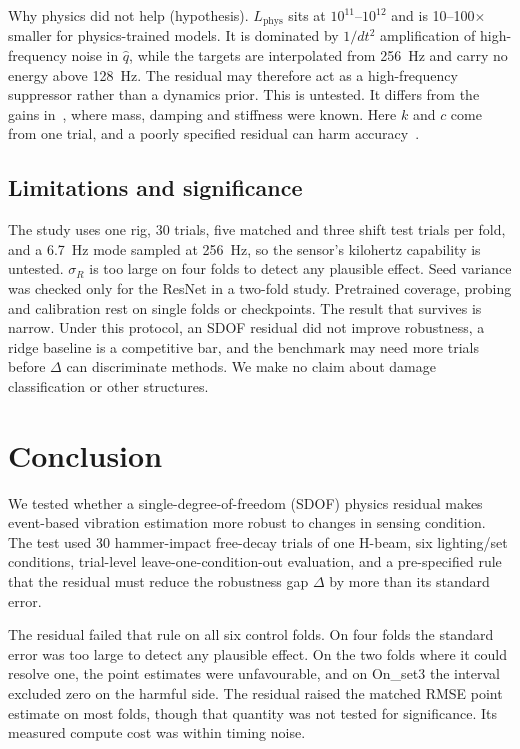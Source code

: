 \documentclass[conference]{IEEEtran}
\begin{document}
Why physics did not help (hypothesis). $L_{\mathrm{phys}}$ sits at $10^{11}$--$10^{12}$ and is 10--100$\times$ smaller for physics-trained models. It is dominated by $1/dt^2$ amplification of high-frequency noise in $\hat{q}$, while the targets are interpolated from 256~Hz and carry no energy above 128~Hz. The residual may therefore act as a high-frequency suppressor rather than a dynamics prior. This is untested. It differs from the gains in~\cite{Wang2024}, where mass, damping and stiffness were known. Here $k$ and $c$ come from one trial, and a poorly specified residual can harm accuracy~\cite{Karniadakis2021}.

\subsection{Limitations and significance}
The study uses one rig, 30 trials, five matched and three shift test trials per fold, and a 6.7~Hz mode sampled at 256~Hz, so the sensor's kilohertz capability is untested. $\sigma_R$ is too large on four folds to detect any plausible effect. Seed variance was checked only for the ResNet in a two-fold study. Pretrained coverage, probing and calibration rest on single folds or checkpoints. The result that survives is narrow. Under this protocol, an SDOF residual did not improve robustness, a ridge baseline is a competitive bar, and the benchmark may need more trials before $\Delta$ can discriminate methods. We make no claim about damage classification or other structures.

\section{Conclusion}
We tested whether a single-degree-of-freedom (SDOF) physics residual makes event-based vibration estimation more robust to changes in sensing condition. The test used 30 hammer-impact free-decay trials of one H-beam, six lighting/set conditions, trial-level leave-one-condition-out evaluation, and a pre-specified rule that the residual must reduce the robustness gap $\Delta$ by more than its standard error.

The residual failed that rule on all six control folds. On four folds the standard error was too large to detect any plausible effect. On the two folds where it could resolve one, the point estimates were unfavourable, and on On\_set3 the interval excluded zero on the harmful side. The residual raised the matched RMSE point estimate on most folds, though that quantity was not tested for significance. Its measured compute cost was within timing noise.
\end{document}
